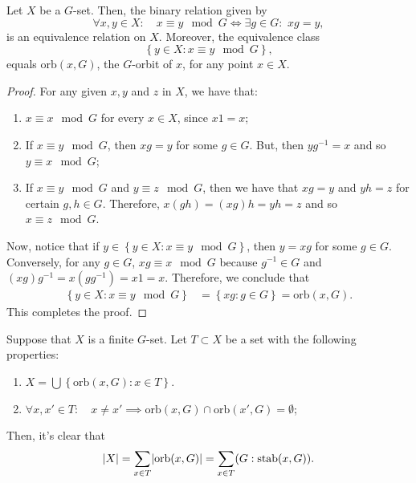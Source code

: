 \begin{proposition}\label{prop:orbit-decomposition-of-g-sets}
  Let \(X\) be a \(G\)-set. Then, the binary relation given by
  \begin{equation}\label{eq:g-equivalent-points}
    \forall{x,y\in{X}}:
    \quad
    x\equiv{y}\mod{G}
    \iff
    \exists{g\in{G}}:
    \,\,
    xg=y,
  \end{equation}
  is an equivalence relation on \(X\). Moreover, the equivalence class
  \[
    \left\{y\in{X}:x\equiv{y}\mod{G}\right\},
  \]
  equals \(\text{orb}(x,G)\), the \(G\)-orbit of \(x\), for any point \(x\in{X}\).
\end{proposition}

\begin{proof}
  For any given \(x,y\) and \(z\) in \(X\), we have that:
  \begin{enumerate}
    \item
      \(x\equiv{x}\mod{G}\) for every \(x\in{X}\), since \(x1=x\);
    \item
      If \(x\equiv{y}\mod{G}\), then \(xg=y\) for some \(g\in{G}\). But, then \(yg^{-1}=x\) and so \(y\equiv{x}\mod{G}\);
    \item
      If \(x\equiv{y}\mod{G}\) and \(y\equiv{z}\mod{G}\), then we have that \(xg=y\) and \(yh=z\) for certain \(g,h\in{G}\). Therefore, \(x(gh)=(xg)h=yh=z\) and so \(x\equiv{z}\mod{G}\).
  \end{enumerate}
  Now, notice that if \(y\in\left\{y\in{X}:x\equiv{y}\mod{G}\right\}\), then \(y=xg\) for some \(g\in{G}\). Conversely, for any \(g\in{G}\), \(xg\equiv{x}\mod{G}\) because \(g^{-1}\in{G}\) and \((xg)g^{-1}=x(gg^{-1})=x1=x\). Therefore, we conclude that
  \begin{align*}
    \left\{y\in{X}:x\equiv{y}\mod{G}\right\}
    &=
    \left\{xg:g\in{G}\right\}
    =\text{orb}(x,G).
  \end{align*}
  This completes the proof.
\end{proof}

Suppose that \(X\) is a finite \(G\)-set. Let \(T\subset{X}\) be a set with the
following properties:
\begin{enumerate}
  \item
    \(X=\bigcup\left\{\text{orb}(x,G):x\in{T}\right\}\).
  \item
    \(\forall{x,x'\in{T}}:\quad{x\neq{x'}}\implies{\text{orb}(x,G)\cap{\text{orb}(x',G)}}=\emptyset\);
\end{enumerate}
Then, it's clear that
\begin{equation}\label{eq:numeric-characteristic}
  \lvert X\rvert
  =
  \sum\limits_{x\in{T}}\lvert\text{orb}(x,G)\rvert
  =
  \sum\limits_{x\in{T}}(G:\text{stab}(x,G)).
\end{equation}

